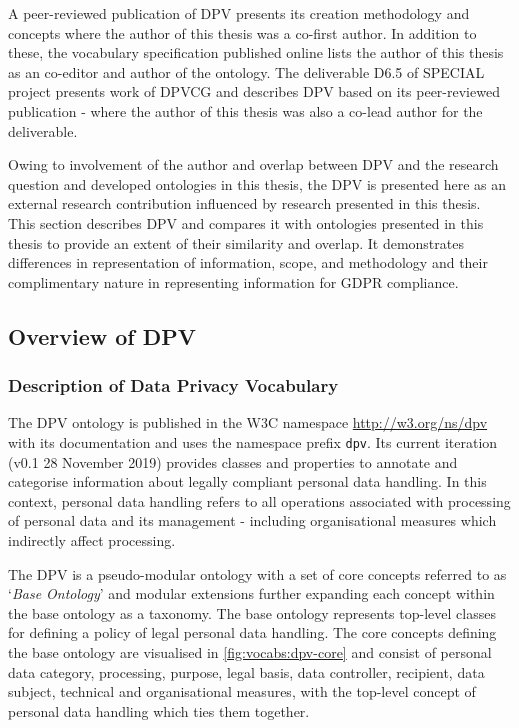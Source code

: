 A peer-reviewed publication of DPV \cite{pandit_creating_2019} presents its creation methodology and concepts where the author of this thesis was a co-first author.
In addition to these, the vocabulary specification published online lists the author of this thesis as an co-editor and author of the ontology.
The deliverable D6.5 \cite{pandit_d6.5_2019} of SPECIAL project presents work of DPVCG and describes DPV based on its peer-reviewed publication \cite{pandit_creating_2019} - where the author of this thesis was also a co-lead author for the deliverable.

Owing to involvement of the author and overlap between DPV and the research question and developed ontologies in this thesis, the DPV is presented here as an external research contribution influenced by research presented in this thesis.
This section describes DPV and compares it with ontologies presented in this thesis to provide an extent of their similarity and overlap.
It demonstrates differences in representation of information, scope, and methodology and their complimentary nature in representing information for GDPR compliance.

\subsection{Overview of DPV}
\subsubsection{Description of Data Privacy Vocabulary}
The DPV ontology is published in the W3C namespace \url{http://w3.org/ns/dpv} with its documentation and uses the namespace prefix \texttt{dpv}. 
Its current iteration (v0.1 28 November 2019) provides classes and properties to annotate and categorise information about legally compliant personal data handling. In this context, personal data handling refers to all operations associated with processing of personal data and its management - including organisational measures which indirectly affect processing.

The DPV is a pseudo-modular ontology with a set of core concepts referred to as `\textit{Base Ontology}' and modular extensions further expanding each concept within the base ontology as a taxonomy. The base ontology represents top-level classes for defining a policy of legal personal data handling.
The core concepts defining the base ontology are visualised in \autoref{fig:vocabs:dpv-core} and consist of personal data category, processing, purpose, legal basis, data controller, recipient, data subject, technical and organisational measures, with the top-level concept of personal data handling which ties them together.

